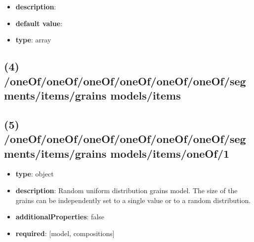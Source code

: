 \begin{itemize}[leftmargin=3em]\item {\bf description}: 
\item {\bf default value}: 
\item {\bf type}: array
\end{itemize}\subsection{(4) /oneOf/oneOf/oneOf/oneOf/oneOf/oneOf/segments/items/grains models/items}

\subsection{(5) /oneOf/oneOf/oneOf/oneOf/oneOf/oneOf/segments/items/grains models/items/oneOf/1}
\begin{itemize}[leftmargin=5em]\item {\bf type}: object
\item {\bf description}: Random uniform distribution grains model. The size of the grains can be independently set to a single value or to a random distribution.
\item {\bf additionalProperties}: false
\item {\bf required}: [model, compositions]\end{itemize}
